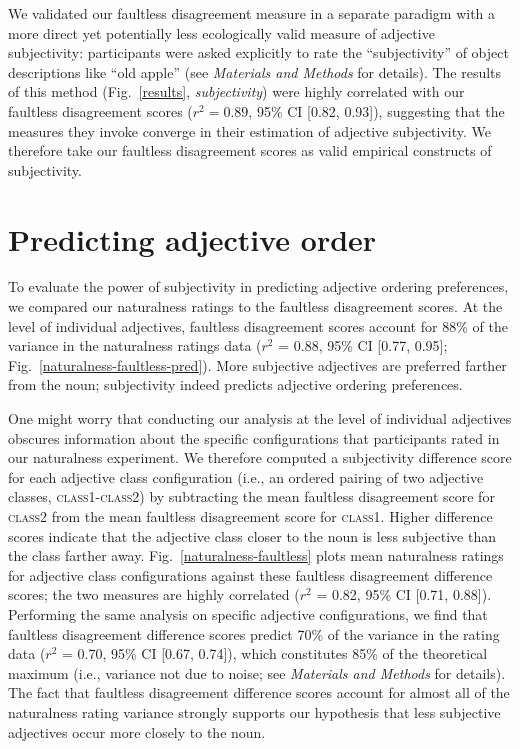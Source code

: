 \documentclass{pnastwo}
\begin{document}
\begin{article}
We validated our faultless disagreement measure in a separate paradigm with a more direct yet potentially less ecologically valid measure of adjective subjectivity: participants were asked explicitly to rate the ``subjectivity'' of object descriptions like ``old apple'' (see \emph{Materials and Methods} for details). The results of this method (Fig.~\ref{results}, \emph{subjectivity}) were highly correlated with our faultless disagreement scores ($r^{2} = 0.89$, 95\% CI [0.82, 0.93]), suggesting that the measures they invoke converge in their estimation of adjective subjectivity. We therefore take our faultless disagreement scores as valid empirical constructs of subjectivity.

\section{Predicting adjective order}

To evaluate the power of subjectivity in predicting adjective ordering preferences, we compared our naturalness ratings to the faultless disagreement scores. At the level of individual adjectives, faultless disagreement scores account for 88\% of the variance in the naturalness ratings data ($r^2$ = 0.88, 95\% CI [0.77, 0.95]; Fig.~\ref{naturalness-faultless-pred}). 
More subjective adjectives are preferred farther from the noun; subjectivity indeed predicts adjective ordering preferences.

One might worry that conducting our analysis at the level of individual adjectives obscures information about the specific configurations that participants rated in our naturalness experiment.
We therefore computed a subjectivity difference score for each adjective class configuration (i.e., an ordered pairing of two adjective classes, \textsc{class1}-\textsc{class2}) by subtracting the mean faultless disagreement score for \textsc{class2} from the mean faultless disagreement score for \textsc{class1}. Higher difference scores indicate that the adjective class closer to the noun is less subjective than the class farther away. Fig.~\ref{naturalness-faultless} plots mean naturalness ratings for adjective class configurations against these faultless disagreement difference scores; the two measures are highly correlated ($r^2$ = 0.82, 95\% CI [0.71, 0.88]). Performing the same analysis on specific adjective configurations, we find that faultless disagreement difference scores predict 70\% of the variance in the rating data ($r^2$ = 0.70, 95\% CI [0.67, 0.74]), which constitutes 85\% of the theoretical maximum (i.e., variance not due to noise; see \emph{Materials and Methods} for details). The fact that faultless disagreement difference scores account for almost all of the naturalness rating variance strongly supports our hypothesis that less subjective adjectives occur more closely to the noun. 


\end{article}
\end{document}
